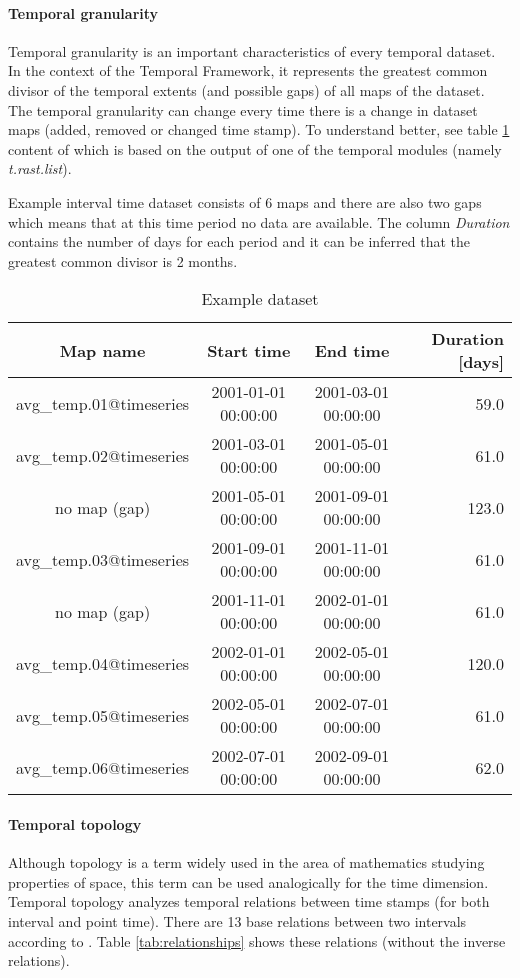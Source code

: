 \documentclass[a4paper,12pt]{article}
\newcommand{\mod}[1]{\textsl{#1}}
\newcommand{\tf}{Temporal Framework\xspace}
\begin{document}
\paragraph{Temporal granularity}
\label{sec:temporalGranularity}
Temporal granularity is an important characteristics of every temporal dataset.
In the context of the \tf , it represents the greatest common divisor
of the temporal extents (and possible gaps) of all maps of the dataset.
The temporal granularity can change every time there is a change in dataset maps
(added, removed or changed time stamp).
To understand better, see table \ref{tab:granularity} content of which is based on the output
of one of the temporal modules (namely \mod{t.rast.list}).

Example interval time dataset consists of 6 maps and
there are also two gaps which means that at this time period no data are available.
The column \emph{Duration} contains the number of days for each period and it can be inferred
that the greatest common divisor is 2 months.
\begin{table}[h!]
  \centering
\setlength{\extrarowheight}{3pt}
\begin{tabular}{cccr}
\toprule
 Map name & Start time & End time & Duration [days]\\\midrule
avg\_temp.01@timeseries &    2001-01-01 00:00:00  &   2001-03-01 00:00:00  &   59.0\\
avg\_temp.02@timeseries  &  2001-03-01 00:00:00  &   2001-05-01 00:00:00   &  61.0\\
no map (gap)    &  2001-05-01 00:00:00    & 2001-09-01 00:00:00   &  123.0\\
avg\_temp.03@timeseries     & 2001-09-01 00:00:00   &  2001-11-01 00:00:00  &   61.0\\
no map (gap) &   2001-11-01 00:00:00   &  2002-01-01 00:00:00  &   61.0 \\
avg\_temp.04@timeseries  &    2002-01-01 00:00:00   &  2002-05-01 00:00:00     & 120.0 \\
avg\_temp.05@timeseries  &      2002-05-01 00:00:00 &    2002-07-01 00:00:00 &    61.0 \\
avg\_temp.06@timeseries &     2002-07-01 00:00:00  &   2002-09-01 00:00:00   &  62.0\\
\bottomrule
\end{tabular}

  \caption{Example dataset}
  \label{tab:granularity}
\end{table}


\paragraph{Temporal topology}
\label{sec:temporalTopology}
Although topology is a term widely used in the area of mathematics studying properties of space,
this term can be used analogically for the time dimension.
Temporal topology analyzes temporal relations between time stamps (for both interval and point time).
There are 13 base relations between two intervals according to \cite{relationships}.
Table \ref{tab:relationships} shows these relations (without the inverse relations).
\end{document}
